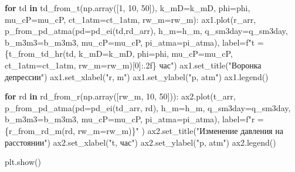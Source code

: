 \documentclass[
  russian,
  letterpaper,
  DIV=11,
  numbers=noendperiod,
  oneside]{scrartcl}
\newenvironment{Shaded}{\begin{snugshade}}{\end{snugshade}}
\newcommand{\ControlFlowTok}[1]{\textcolor[rgb]{0.00,0.23,0.31}{\textbf{#1}}}
\newcommand{\DecValTok}[1]{\textcolor[rgb]{0.68,0.00,0.00}{#1}}
\newcommand{\KeywordTok}[1]{\textcolor[rgb]{0.00,0.23,0.31}{\textbf{#1}}}
\newcommand{\NormalTok}[1]{\textcolor[rgb]{0.00,0.23,0.31}{#1}}
\newcommand{\OperatorTok}[1]{\textcolor[rgb]{0.37,0.37,0.37}{#1}}
\newcommand{\SpecialCharTok}[1]{\textcolor[rgb]{0.37,0.37,0.37}{#1}}
\newcommand{\SpecialStringTok}[1]{\textcolor[rgb]{0.13,0.47,0.30}{#1}}
\newcommand{\StringTok}[1]{\textcolor[rgb]{0.13,0.47,0.30}{#1}}
\begin{document}
\begin{Shaded}
\begin{Highlighting}[]
\ControlFlowTok{for}\NormalTok{ td }\KeywordTok{in}\NormalTok{ td\_from\_t(np.array([}\DecValTok{1}\NormalTok{, }\DecValTok{10}\NormalTok{, }\DecValTok{50}\NormalTok{]), }
\NormalTok{                    k\_mD}\OperatorTok{=}\NormalTok{k\_mD, }
\NormalTok{                    phi}\OperatorTok{=}\NormalTok{phi, }
\NormalTok{                    mu\_cP}\OperatorTok{=}\NormalTok{mu\_cP, }
\NormalTok{                    ct\_1atm}\OperatorTok{=}\NormalTok{ct\_1atm, }
\NormalTok{                    rw\_m}\OperatorTok{=}\NormalTok{rw\_m):}
\NormalTok{    ax1.plot(r\_arr, }
\NormalTok{             p\_from\_pd\_atma(pd}\OperatorTok{=}\NormalTok{pd\_ei(td,rd\_arr), }
\NormalTok{                            h\_m}\OperatorTok{=}\NormalTok{h\_m, }
\NormalTok{                            q\_sm3day}\OperatorTok{=}\NormalTok{q\_sm3day, }
\NormalTok{                            b\_m3m3}\OperatorTok{=}\NormalTok{b\_m3m3, }
\NormalTok{                            mu\_cP}\OperatorTok{=}\NormalTok{mu\_cP, }
\NormalTok{                            pi\_atma}\OperatorTok{=}\NormalTok{pi\_atma), }
\NormalTok{             label}\OperatorTok{=}\SpecialStringTok{f"t = }\SpecialCharTok{\{}\NormalTok{t\_from\_td\_hr(td, k\_mD}\OperatorTok{=}\NormalTok{k\_mD, phi}\OperatorTok{=}\NormalTok{phi, mu\_cP}\OperatorTok{=}\NormalTok{mu\_cP, ct\_1atm}\OperatorTok{=}\NormalTok{ct\_1atm, rw\_m}\OperatorTok{=}\NormalTok{rw\_m)[}\DecValTok{0}\NormalTok{]}\SpecialCharTok{:.2f\}}\SpecialStringTok{ час"}\NormalTok{)}
\NormalTok{ax1.set\_title(}\StringTok{"Воронка депрессии"}\NormalTok{)}
\NormalTok{ax1.set\_xlabel(}\StringTok{"r, m"}\NormalTok{)}
\NormalTok{ax1.set\_ylabel(}\StringTok{"p, atm"}\NormalTok{)}
\NormalTok{ax1.legend()}

\ControlFlowTok{for}\NormalTok{ rd }\KeywordTok{in}\NormalTok{ rd\_from\_r(np.array([rw\_m, }\DecValTok{10}\NormalTok{, }\DecValTok{50}\NormalTok{])):}
\NormalTok{    ax2.plot(t\_arr, }
\NormalTok{             p\_from\_pd\_atma(pd}\OperatorTok{=}\NormalTok{pd\_ei(td\_arr, rd), }
\NormalTok{                            h\_m}\OperatorTok{=}\NormalTok{h\_m, }
\NormalTok{                            q\_sm3day}\OperatorTok{=}\NormalTok{q\_sm3day, }
\NormalTok{                            b\_m3m3}\OperatorTok{=}\NormalTok{b\_m3m3, }
\NormalTok{                            mu\_cP}\OperatorTok{=}\NormalTok{mu\_cP, }
\NormalTok{                            pi\_atma}\OperatorTok{=}\NormalTok{pi\_atma),}
\NormalTok{             label}\OperatorTok{=}\SpecialStringTok{f"r = }\SpecialCharTok{\{}\NormalTok{r\_from\_rd\_m(rd, rw\_m}\OperatorTok{=}\NormalTok{rw\_m)}\SpecialCharTok{\}}\SpecialStringTok{"}\NormalTok{ )}
\NormalTok{ax2.set\_title(}\StringTok{"Изменение давления на расстоянии"}\NormalTok{)}
\NormalTok{ax2.set\_xlabel(}\StringTok{"t, час"}\NormalTok{)}
\NormalTok{ax2.set\_ylabel(}\StringTok{"p, atm"}\NormalTok{)}
\NormalTok{ax2.legend()}

\NormalTok{plt.show()}
\end{Highlighting}
\end{Shaded}
\end{document}
